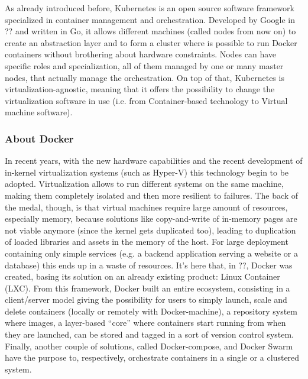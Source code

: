 \documentclass[10pt]{book}
\begin{document}
As already introduced before, Kubernetes is an open source software framework 
specialized in container management and orchestration. Developed by Google in 
?? and written in Go, it allows different 
machines (called nodes from now on) to create an abstraction layer and to form 
a cluster where is possible to run Docker containers without brothering about 
hardware constraints. Nodes can have specific roles and specialization, all of 
them managed by one or many master nodes, that actually manage the 
orchestration.
On top of that, Kubernetes is virtualization-agnostic, meaning that it offers 
the possibility to change the virtualization software in use (i.e. from 
Container-based technology to Virtual machine software).

\subsubsection{About Docker}

In recent years, with the new hardware capabilities and the recent development 
of in-kernel virtualization systems (such as Hyper-V) this technology 
begin to be adopted. Virtualization allows to run different systems on the 
same machine, making them completely isolated and then more resilient to 
failures. The back of the medal, though, is that virtual machines require large 
amount of resources, especially memory, because solutions like copy-and-write 
of in-memory pages are not viable anymore (since the kernel gets duplicated 
too), leading to duplication of loaded libraries and assets in the memory of 
the host. 
For large deployment containing only simple services (e.g. a backend 
application serving a website or a database) this ends up in a waste of 
resources.  It's here that, in ??, Docker was 
created, basing its solution on an already existing product: Linux Container 
(LXC). From this framework, Docker built an entire ecosystem, consisting in a 
client/server model giving the possibility for users to simply launch, scale and 
delete containers (locally or remotely with Docker-machine), a repository 
system where images, a layer-based ``core'' where containers start running from 
when they are launched, can be stored and tagged in a sort of version control 
system. Finally, another couple of solutions, called Docker-compose, and Docker 
Swarm have the purpose to, respectively, orchestrate containers in a single or 
a clustered system. 
\end{document}
